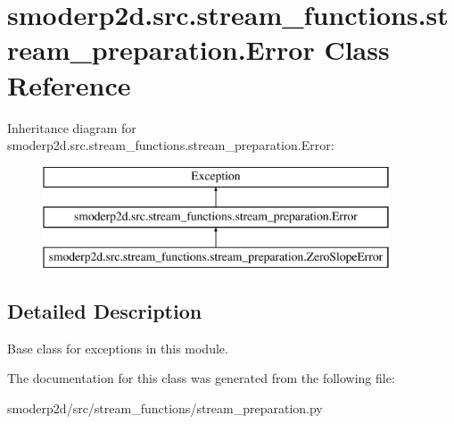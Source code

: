 \hypertarget{classsmoderp2d_1_1src_1_1stream__functions_1_1stream__preparation_1_1Error}{\section{smoderp2d.\-src.\-stream\-\_\-functions.\-stream\-\_\-preparation.\-Error Class Reference}
\label{classsmoderp2d_1_1src_1_1stream__functions_1_1stream__preparation_1_1Error}
}
Inheritance diagram for smoderp2d.\-src.\-stream\-\_\-functions.\-stream\-\_\-preparation.\-Error\-:\begin{figure}[H]
\begin{center}
\leavevmode
\includegraphics[height=3.000000cm]{classsmoderp2d_1_1src_1_1stream__functions_1_1stream__preparation_1_1Error}
\end{center}
\end{figure}


\subsection{Detailed Description}
\begin{DoxyVerb}Base class for exceptions in this module.\end{DoxyVerb}
 

The documentation for this class was generated from the following file\-:\begin{DoxyCompactItemize}
\item 
smoderp2d/src/stream\-\_\-functions/stream\-\_\-preparation.\-py\end{DoxyCompactItemize}
